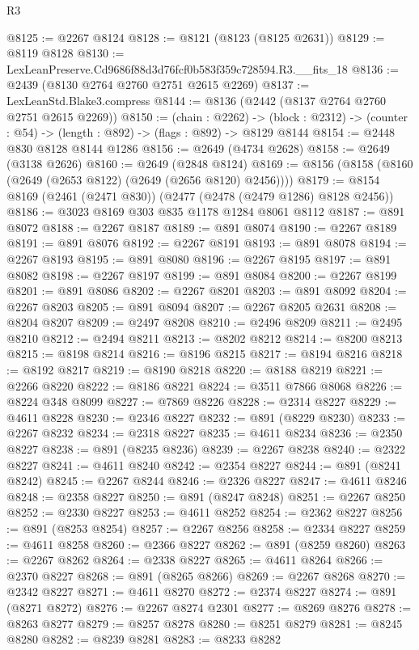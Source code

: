 \begin{lexlean}{R3}
\begin{coremodule}
@8125 := @2267 @8124
@8128 := @8121 (@8123 (@8125 @2631))
@8129 := @8119 @8128
@8130 := LexLeanPreserve.Cd9686f88d3d76fcf0b583f359c728594.R3.__fits_18
@8136 := @2439 (@8130 @2764 @2760 @2751 @2615 @2269)
@8137 := LexLeanStd.Blake3.compress
@8144 := @8136 (@2442 (@8137 @2764 @2760 @2751 @2615 @2269))
@8150 := (chain : @2262) ->
  (block : @2312) -> (counter : @54) -> (length : @892) -> (flags : @892) -> @8129 @8144
@8154 := @2448 @830 @8128 @8144 @1286
@8156 := @2649 (@4734 @2628)
@8158 := @2649 (@3138 @2626)
@8160 := @2649 (@2848 @8124)
@8169 := @8156 (@8158 (@8160 (@2649 (@2653 @8122) (@2649 (@2656 @8120) @2456))))
@8179 := @8154 @8169 (@2461 (@2471 @830)) (@2477 (@2478 (@2479 @1286) @8128 @2456))
@8186 := @3023 @8169 @303 @835 @1178 @1284 @8061 @8112
@8187 := @891 @8072
@8188 := @2267 @8187
@8189 := @891 @8074
@8190 := @2267 @8189
@8191 := @891 @8076
@8192 := @2267 @8191
@8193 := @891 @8078
@8194 := @2267 @8193
@8195 := @891 @8080
@8196 := @2267 @8195
@8197 := @891 @8082
@8198 := @2267 @8197
@8199 := @891 @8084
@8200 := @2267 @8199
@8201 := @891 @8086
@8202 := @2267 @8201
@8203 := @891 @8092
@8204 := @2267 @8203
@8205 := @891 @8094
@8207 := @2267 @8205 @2631
@8208 := @8204 @8207
@8209 := @2497 @8208
@8210 := @2496 @8209
@8211 := @2495 @8210
@8212 := @2494 @8211
@8213 := @8202 @8212
@8214 := @8200 @8213
@8215 := @8198 @8214
@8216 := @8196 @8215
@8217 := @8194 @8216
@8218 := @8192 @8217
@8219 := @8190 @8218
@8220 := @8188 @8219
@8221 := @2266 @8220
@8222 := @8186 @8221
@8224 := @3511 @7866 @8068
@8226 := @8224 @348 @8099
@8227 := @7869 @8226
@8228 := @2314 @8227
@8229 := @4611 @8228
@8230 := @2346 @8227
@8232 := @891 (@8229 @8230)
@8233 := @2267 @8232
@8234 := @2318 @8227
@8235 := @4611 @8234
@8236 := @2350 @8227
@8238 := @891 (@8235 @8236)
@8239 := @2267 @8238
@8240 := @2322 @8227
@8241 := @4611 @8240
@8242 := @2354 @8227
@8244 := @891 (@8241 @8242)
@8245 := @2267 @8244
@8246 := @2326 @8227
@8247 := @4611 @8246
@8248 := @2358 @8227
@8250 := @891 (@8247 @8248)
@8251 := @2267 @8250
@8252 := @2330 @8227
@8253 := @4611 @8252
@8254 := @2362 @8227
@8256 := @891 (@8253 @8254)
@8257 := @2267 @8256
@8258 := @2334 @8227
@8259 := @4611 @8258
@8260 := @2366 @8227
@8262 := @891 (@8259 @8260)
@8263 := @2267 @8262
@8264 := @2338 @8227
@8265 := @4611 @8264
@8266 := @2370 @8227
@8268 := @891 (@8265 @8266)
@8269 := @2267 @8268
@8270 := @2342 @8227
@8271 := @4611 @8270
@8272 := @2374 @8227
@8274 := @891 (@8271 @8272)
@8276 := @2267 @8274 @2301
@8277 := @8269 @8276
@8278 := @8263 @8277
@8279 := @8257 @8278
@8280 := @8251 @8279
@8281 := @8245 @8280
@8282 := @8239 @8281
@8283 := @8233 @8282

\end{coremodule}
\end{lexlean}

